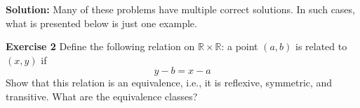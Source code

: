 \documentclass[12pt,oneside]{exam}
\newenvironment{exercise}[1]{\vspace{.1in}\noindent\textbf{Exercise #1 \hspace{.05em}}}{}
\newenvironment{newsolution}{\vspace{.1in}\noindent\textbf{Solution: \hspace{.05em}}}{}
\begin{document}
\begin{newsolution}
Many of these problems have multiple correct solutions. In such cases, what is presented below is just one example. 
\end{newsolution}

\begin{exercise}{2}
Define the following relation on $\mathbb{R} \times \mathbb{R}$: a point $(a,b)$ is related to $(x,y)$ if 
\begin{equation*}
y-b=x-a
\end{equation*}
Show that this relation is an equivalence, i.e., it is reflexive, symmetric, and transitive. What are the equivalence classes?
\end{exercise}
\end{document}
